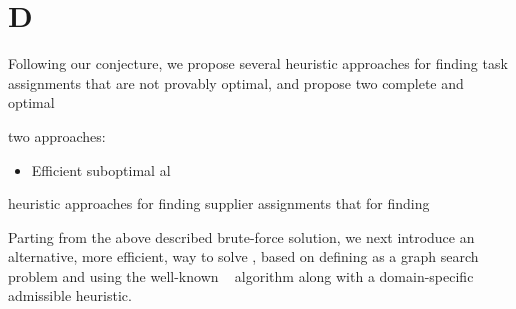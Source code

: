 



















\section{D}



Following our conjecture, we propose several heuristic approaches for finding task assignments that are not provably optimal, 
and propose two complete and optimal \samd 

two approaches:
\begin{itemize}
    \item Efficient suboptimal al
\end{itemize}heuristic approaches 
for finding supplier assignments that
for finding 


Parting from the above described brute-force solution, we next introduce an alternative, more efficient, way to solve \samd, based on defining \samd as a graph search problem and using the well-known \astar~\citep{hart1968formal} algorithm along with a domain-specific admissible heuristic. 

